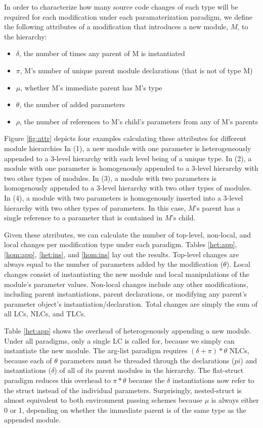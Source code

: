 In order to characterize how many source code changes of each type will be required for each modification under each paramaterization paradigm,
we define the following attributes of a modification that introduces a new module, $M$, to the hierarchy:
\begin{itemize}%
\item $\delta$, the number of times any parent of M is instantiated
\item $\pi$, M's number of unique parent module declarations (that is not of type M)
\item $\mu$, whether M's immediate parent has M's type
\item $\theta$, the number of added parameters
\item $\rho$, the number of references to M's child's parameters from any of M's parents
\end{itemize}

Figure \ref{fig:attr} depicts four examples calculating these attributes for different module hierarchies
In (1), a new module with one parameter is heterogeneously appended to a 3-level hierarchy with each level being of a unique type.
In (2), a module with one parameter is homogenously appended to a 3-level hierarchy with two other types of modules.
In (3), a module with two parameters is homogenously appended to a 3-level hierarchy with two other types of modules.
In (4), a module with two parameters is homogenously inserted into a 3-level hierarchy with two other types of parameters.
In this case, $M$'s parent has a single reference to a parameter that is contained in $M$'s child.

Given these atrributes, we can calculate the number of top-level, non-local, and local changes per modification type under each paradigm.
Tables \ref{het:app}, \ref{hom:app}, \ref{het:ins}, and \ref{hom:ins} lay out the results.
Top-level changes are always equal to the number of parameters added by the modification ($\theta$).
Local changes consist of instantiating the new module and local manipulations of the module's parameter values.
Non-local changes include any other modifications, including parent instantiations, parent declarations, or modifying any parent's parameter object's instantiation/declaration.
Total changes are simply the sum of all LCs, NLCs, and TLCs.

Table \ref{het:app} shows the overhead of heterogenously appending a new module.
Under all paradigms, only a single LC is called for, because we simply can instantiate the new module.
The arg-list paradigm requires $(\delta+\pi)*\theta$ NLCs, because each of $\theta$ parameters must be threaded through the declarations ($pi$) and instantiations ($\delta$) of all of its parent modules in the hierarchy.
The flat-struct paradigm reduces this overhead to $\pi*\theta$ because the $\delta$ instantiations now refer to the struct instead of the individual parameters.
Surprisingly, nested-struct is almost equivalent to both environment passing schemes because $\mu$ is always either 0 or 1, depending on whether the immediate parent is of the same type as the appended module.

